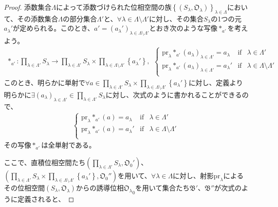 \documentclass[dvipdfmx]{jsarticle}
\begin{document}
\begin{proof}
添数集合$\varLambda$によって添数づけられた位相空間の族$\left\{ \left( S_{\lambda},\mathfrak{O}_{\lambda} \right) \right\}_{\lambda \in \varLambda}$において、その添数集合$\varLambda$の部分集合$\varLambda'$と、$\forall\lambda \in \varLambda \setminus \varLambda'$に対し、その集合$S_{\lambda}$の1つの元$a_{\lambda}'$が定められる。このとき、$a' = \left( a_{\lambda}' \right)_{\lambda \in \varLambda \setminus \varLambda'}$とおき次のような写像$*_{a'}$を考えよう。
\begin{align*}
*_{a'}:\prod_{\lambda \in \varLambda'} S_{\lambda} \rightarrow \prod_{\lambda \in \varLambda'} S_{\lambda} \times \prod_{\lambda \in \varLambda \setminus \varLambda'} \left\{ a_{\lambda}' \right\},\ \ \left\{ \begin{matrix}
{\mathrm{pr}}_{\lambda}{*_{a'}\left( a_{\lambda} \right)_{\lambda \in \varLambda'}} = a_{\lambda} & \mathrm{if} & \lambda \in \varLambda' \\
{\mathrm{pr}}_{\lambda}{*_{a'}\left( a_{\lambda} \right)_{\lambda \in \varLambda'}} = a_{\lambda}' & \mathrm{if} & \lambda \in \varLambda \setminus \varLambda' \\
\end{matrix} \right.\ 
\end{align*}
このとき、明らかに単射で$\forall a \in \prod_{\lambda \in \varLambda'} S_{\lambda} \times \prod_{\lambda \in \varLambda \setminus \varLambda'} \left\{ a_{\lambda}' \right\}$に対し、定義より明らかに$\exists\left( a_{\lambda} \right)_{\lambda \in \varLambda'} \in \prod_{\lambda \in \varLambda'} S_{\lambda}$に対し、次式のように書かれることができるので、
\begin{align*}
\left\{ \begin{matrix}
{\mathrm{pr}}_{\lambda}{*_{a'}(a)} = a_{\lambda} & \mathrm{if} & \lambda \in \varLambda' \\
{\mathrm{pr}}_{\lambda}{*_{a'}(a)} = a_{\lambda}' & \mathrm{if} & \lambda \in \varLambda \setminus \varLambda' \\
\end{matrix} \right.\ 
\end{align*}
その写像$*_{a'}$は全単射である。\par
ここで、直積位相空間たち$\left( \prod_{\lambda \in \varLambda'} S_{\lambda},\mathfrak{O}_{0}' \right)$、$\left( \prod_{\lambda \in \varLambda'} S_{\lambda} \times \prod_{\lambda \in \varLambda \setminus \varLambda'} \left\{ a_{\lambda}' \right\},\mathfrak{O}_{0}'' \right)$を用いて、$\forall\lambda \in \varLambda$に対し、射影${\mathrm{pr}}_{\lambda}$によるその位相空間$\left( S_{\lambda},\mathfrak{O}_{\lambda} \right)$からの誘導位相${\mathfrak{O}_{\lambda}}_{0}$を用いて集合たち$\mathfrak{B}'$、$\mathfrak{B}''$が次式のように定義されると、

\end{proof}
\end{document}
